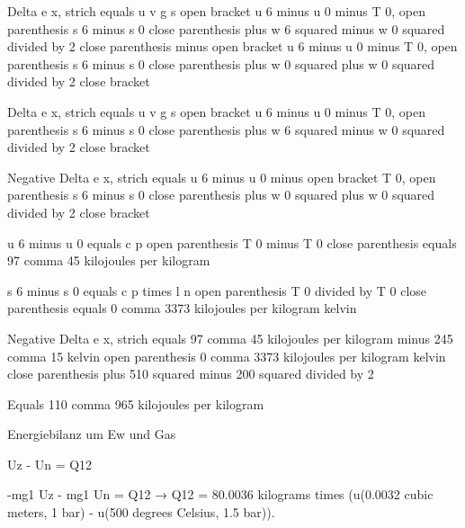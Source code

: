 Delta e x, strich equals u v g s open bracket u 6 minus u 0 minus T 0, open parenthesis s 6 minus s 0 close parenthesis plus w 6 squared minus w 0 squared divided by 2 close parenthesis minus open bracket u 6 minus u 0 minus T 0, open parenthesis s 6 minus s 0 close parenthesis plus w 0 squared plus w 0 squared divided by 2 close bracket

Delta e x, strich equals u v g s open bracket u 6 minus u 0 minus T 0, open parenthesis s 6 minus s 0 close parenthesis plus w 6 squared minus w 0 squared divided by 2 close bracket

Negative Delta e x, strich equals u 6 minus u 0 minus open bracket T 0, open parenthesis s 6 minus s 0 close parenthesis plus w 0 squared plus w 0 squared divided by 2 close bracket

u 6 minus u 0 equals c p open parenthesis T 0 minus T 0 close parenthesis equals 97 comma 45 kilojoules per kilogram

s 6 minus s 0 equals c p times l n open parenthesis T 0 divided by T 0 close parenthesis equals 0 comma 3373 kilojoules per kilogram kelvin

Negative Delta e x, strich equals 97 comma 45 kilojoules per kilogram minus 245 comma 15 kelvin open parenthesis 0 comma 3373 kilojoules per kilogram kelvin close parenthesis plus 510 squared minus 200 squared divided by 2

Equals 110 comma 965 kilojoules per kilogram

Energiebilanz um Ew und Gas

Uz - Un = Q12

-mg1 Uz - mg1 Un = Q12 → Q12 = 80.0036 kilograms times (u(0.0032 cubic meters, 1 bar) - u(500 degrees Celsius, 1.5 bar)).